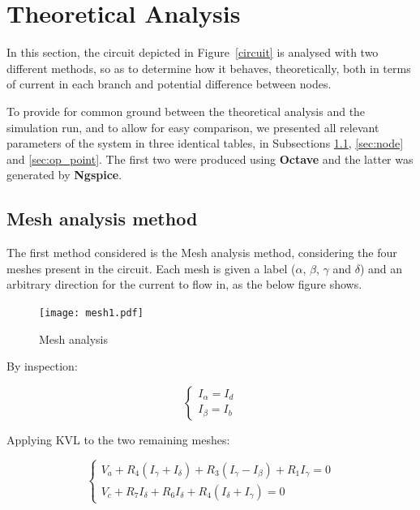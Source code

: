 \section{Theoretical Analysis}
\label{sec:analysis}

In this section, the circuit depicted in Figure~\ref{circuit} is analysed with two different methods, so as to determine how it behaves, theoretically, both in terms of current in each branch and potential difference between nodes.

To provide for common ground between the theoretical analysis and the simulation run, and to allow for easy comparison, we presented all relevant parameters of the system in three identical tables, in Subsections \ref{sec:mesh}, \ref{sec:node} and \ref{sec:op_point}. The first two were produced using {\bf Octave} and the latter was generated by {\bf Ngspice}.

\subsection{Mesh analysis method}
\label{sec:mesh}

The first method considered is the Mesh analysis method, considering the four meshes present in the circuit. Each mesh is given a label ($\alpha$, $\beta$, $\gamma$ and $\delta$) and an arbitrary direction for the current to flow in, as the below figure shows.

\begin{figure}[H]
  \centering
  \texttt{[image: mesh1.pdf]}
  \caption{Mesh analysis}
  \label{mesh_fig}
\end{figure}

\newpage

By inspection:

\begin{equation}
  \begin{cases}
    I_{\alpha} = I_d \\
    I_{\beta} = I_b
  \end{cases}
\end{equation}

Applying KVL to the two remaining meshes:

\begin{equation}
  \begin{cases}
    V_a + R_4 (I_\gamma + I_\delta) + R_3 (I_\gamma - I_\beta) + R_1 I_\gamma = 0 \\
    V_c + R_7 I_\delta + R_6 I_\delta + R_4 (I_\delta + I_\gamma) = 0
  \end{cases}
\end{equation}

